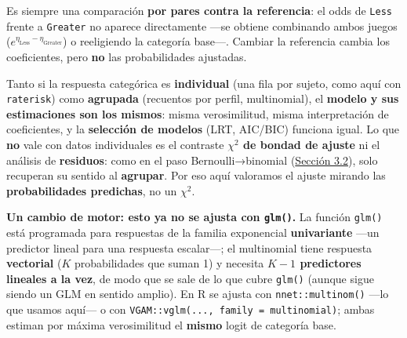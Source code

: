 \documentclass[
  letterpaper,
  DIV=11,
  numbers=noendperiod]{scrartcl}
\begin{document}
Es siempre una comparación \textbf{por pares contra la referencia}: el
odds de \texttt{Less} frente a \texttt{Greater} no aparece directamente
---se obtiene combinando ambos juegos
(\(e^{\eta_{\text{Less}}-\eta_{\text{Greater}}}\)) o reeligiendo la
categoría base---. Cambiar la referencia cambia los coeficientes, pero
\textbf{no} las probabilidades ajustadas.

\begin{tcolorbox}[enhanced jigsaw, coltitle=black, rightrule=.15mm, arc=.35mm, leftrule=.75mm, colback=white, colbacktitle=quarto-callout-note-color!10!white, left=2mm, breakable, toptitle=1mm, toprule=.15mm, bottomtitle=1mm, titlerule=0mm, title=\textcolor{quarto-callout-note-color}{\faInfo}\hspace{0.5em}{Individual o agrupado: qué cambia y qué no}, bottomrule=.15mm, opacityback=0, opacitybacktitle=0.6, colframe=quarto-callout-note-color-frame]

Tanto si la respuesta categórica es \textbf{individual} (una fila por
sujeto, como aquí con \texttt{raterisk}) como \textbf{agrupada}
(recuentos por perfil, multinomial), el \textbf{modelo y sus
estimaciones son los mismos}: misma verosimilitud, misma interpretación
de coeficientes, y la \textbf{selección de modelos} (LRT, AIC/BIC)
funciona igual. Lo que \textbf{no} vale con datos individuales es el
contraste \textbf{\(\chi^2\) de bondad de ajuste} ni el análisis de
\textbf{residuos}: como en el paso Bernoulli→binomial
(\protect\hyperlink{sec-u13-gof-binomial}{Sección 3.2}), solo recuperan
su sentido al \textbf{agrupar}. Por eso aquí valoramos el ajuste mirando
las \textbf{probabilidades predichas}, no un \(\chi^2\).

\end{tcolorbox}

\textbf{Un cambio de motor: esto ya no se ajusta con \texttt{glm()}.} La
función \texttt{glm()} está programada para respuestas de la familia
exponencial \textbf{univariante} ---un predictor lineal para una
respuesta escalar---; el multinomial tiene respuesta \textbf{vectorial}
(\(K\) probabilidades que suman 1) y necesita \textbf{\(K-1\)
predictores lineales a la vez}, de modo que se sale de lo que cubre
\texttt{glm()} (aunque sigue siendo un GLM en sentido amplio). En R se
ajusta con \texttt{nnet::multinom()} ---lo que usamos aquí--- o con
\texttt{VGAM::vglm(...,\ family\ =\ multinomial)}; ambas estiman por
máxima verosimilitud el \textbf{mismo} logit de categoría base.
\end{document}
